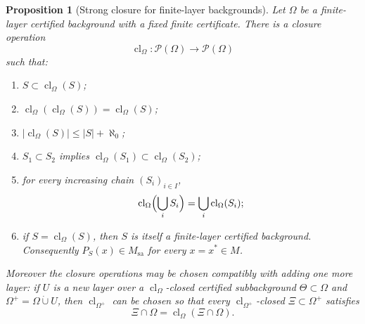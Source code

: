 \documentclass[11pt,letterpaper,reqno]{amsart}
\newtheorem{prop}[thm]{Proposition}
\theoremstyle{definition}
\numberwithin{equation}{section}
\newcommand{\sa}{\mathrm{sa}}
\newcommand{\cl}{\operatorname{cl}}
\begin{document}
\begin{prop}[Strong closure for finite-layer backgrounds]\label{prop:strong-closure}
Let $\Omega$ be a finite-layer certified background with a fixed finite certificate.  There is a closure operation
\[
   \cl_\Omega:\mathcal P(\Omega)\to\mathcal P(\Omega)
\]
such that:
\begin{enumerate}[label=(\roman*)]
\item $S\subset\cl_\Omega(S)$;
\item $\cl_\Omega(\cl_\Omega(S))=\cl_\Omega(S)$;
\item $|\cl_\Omega(S)|\leq |S|+\aleph_0$;
\item $S_1\subset S_2$ implies $\cl_\Omega(S_1)\subset\cl_\Omega(S_2)$;
\item for every increasing chain $(S_i)_{i\in I}$,
\[
   \cl_\Omega\Bigl(\bigcup_iS_i\Bigr)=\bigcup_i\cl_\Omega(S_i);
\]
\item if $S=\cl_\Omega(S)$, then $S$ is itself a finite-layer certified background.  Consequently $P_S(x)\in M_{\sa}$ for every $x=x^*\in M$.
\end{enumerate}
Moreover the closure operations may be chosen compatibly with adding one more layer: if $U$ is a new layer over a $\cl_\Omega$-closed certified subbackground $\Theta\subset\Omega$ and $\Omega^+=\Omega\dot\cup U$, then $\cl_{\Omega^+}$ can be chosen so that every $\cl_{\Omega^+}$-closed $\Xi\subset\Omega^+$ satisfies
\[
   \Xi\cap\Omega=\cl_\Omega(\Xi\cap\Omega).
\]
\end{prop}
\end{document}
